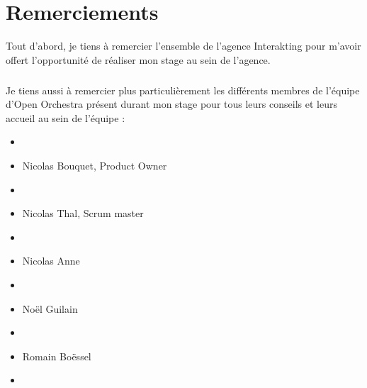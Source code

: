 \chapter*{Remerciements}
Tout d'abord, je tiens à remercier l'ensemble de l'agence Interakting pour m'avoir offert l'opportunité de réaliser mon stage au sein de l'agence.
\paragraph{}
Je tiens aussi à remercier plus particulièrement les différents membres de l'équipe d'Open Orchestra présent durant mon stage pour tous leurs conseils et leurs accueil au sein de l'équipe : 

\begin{itemize}
\item[]
\item Nicolas Bouquet, Product Owner
\item[]
\item Nicolas Thal, Scrum master
\item[]
\item Nicolas Anne 
\item[]
\item Noël Guilain
\item[]
\item Romain Boëssel
\item[]
\end{itemize}